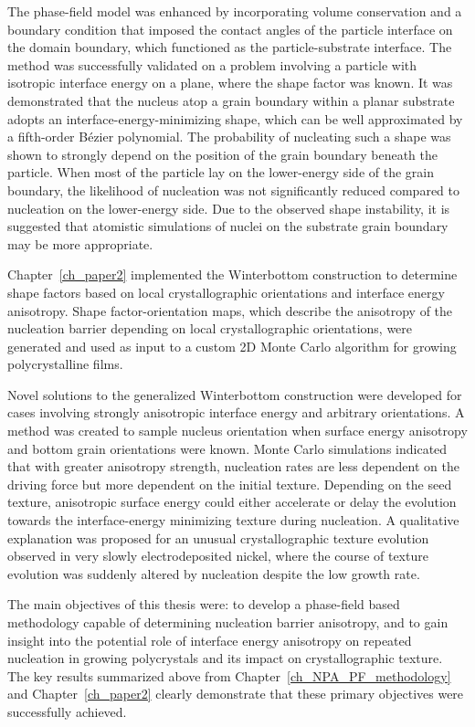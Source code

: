 The phase-field model was enhanced by incorporating volume conservation and a boundary condition that imposed the contact angles of the particle interface on the domain boundary, which functioned as the particle-substrate interface.
The method was successfully validated on a problem involving a particle with isotropic interface energy on a plane, where the shape factor was known.
It was demonstrated that the nucleus atop a grain boundary within a planar substrate adopts an interface-energy-minimizing shape, which can be well approximated by a fifth-order Bézier polynomial.
The probability of nucleating such a shape was shown to strongly depend on the position of the grain boundary beneath the particle. When most of the particle lay on the lower-energy side of the grain boundary, the likelihood of nucleation was not significantly reduced compared to nucleation on the lower-energy side.
Due to the observed shape instability, it is suggested that atomistic simulations of nuclei on the substrate grain boundary may be more appropriate.

Chapter~\ref{ch_paper2} implemented the Winterbottom construction to determine shape factors based on local crystallographic orientations and interface energy anisotropy. Shape factor-orientation maps, which describe the anisotropy of the nucleation barrier depending on local crystallographic orientations, were generated and used as input to a custom 2D Monte Carlo algorithm for growing polycrystalline films.

Novel solutions to the generalized Winterbottom construction were developed for cases involving strongly anisotropic interface energy and arbitrary orientations.
A method was created to sample nucleus orientation when surface energy anisotropy and bottom grain orientations were known.
Monte Carlo simulations indicated that with greater anisotropy strength, nucleation rates are less dependent on the driving force but more dependent on the initial texture.
Depending on the seed texture, anisotropic surface energy could either accelerate or delay the evolution towards the interface-energy minimizing texture during nucleation.
A qualitative explanation was proposed for an unusual crystallographic texture evolution observed in very slowly electrodeposited nickel, where the course of texture evolution was suddenly altered by nucleation despite the low growth rate.

The main objectives of this thesis were: to develop a phase-field based methodology capable of determining nucleation barrier anisotropy, and to gain insight into the potential role of interface energy anisotropy on repeated nucleation in growing polycrystals and its impact on crystallographic texture. The key results summarized above from Chapter~\ref{ch_NPA_PF_methodology} and Chapter~\ref{ch_paper2} clearly demonstrate that these primary objectives were successfully achieved.


